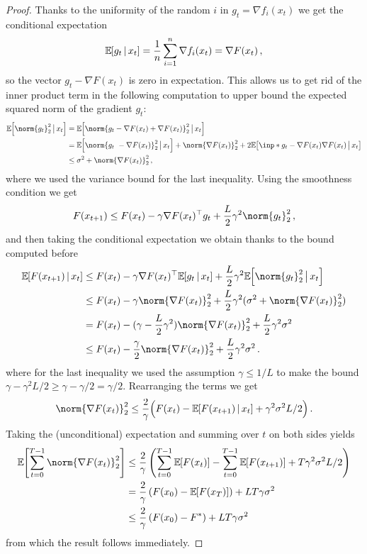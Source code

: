 \documentclass{article}
\begin{document}
\begin{proof}
  Thanks to the uniformity of the random $i$ in $g_t = \nabla f_i (x_t)$ we get the conditional expectation
  \[
    \mathbb{\operatorname{\mathbb{E}}}_{\!\!}\left[g_t \,|\, x_t\right] = \frac{1}{n} \sum_{i=1}^n \nabla f_i(x_t) = \nabla F(x_t)
    \, ,
  \]
  so the vector $g_t - \nabla F(x_t)$ is zero in expectation. This allows us to get rid of the inner product term in the following computation to upper bound the expected squared norm of the gradient $g_t$:
  \begin{align*}
    \expec{\norm{g_t}_2^2  \,\big|\, x_t}
     & =
    \expec{\norm{g_t - \nabla F(x_t) + \nabla F(x_t)}_2^2  \,\big|\, x_t}
    \\
     & =
    \expec{\norm{g_t\ - \nabla F(x_t)}_2^2  \,\big|\, x_t} + \norm{\nabla F(x_t)}_2^2 + 2 \expec{ \inp*{g_t - \nabla F(x_t)}{\nabla F(x_t)} \,\big|\, x_t}
    \\
     & \leq
    \sigma^2 + \norm{\nabla F(x_t)}_2^2
    \, ,
  \end{align*}
  where we used the variance bound for the last inequality.
  Using the smoothness condition we get
  \[
    F(x_{t+1}) \leq F(x_t) - \gamma \nabla F(x_t)^\top g_t + \frac{L}{2} \gamma^2 \norm{g_t}_2^2
    \, ,
  \]
  and then taking the conditional expectation we obtain thanks to the bound computed before
  \begin{align*}
    \expec{F(x_{t+1})  \,|\, x_t}
     & \leq
    F(x_t) - \gamma \nabla F(x_t)^\top \expec{g_t \,|\, x_t} + \frac{L}{2} \gamma^2 \expec{\norm{g_t}_2^2 \,\big|\, x_t}
    \\
     & \leq
    F(x_t) - \gamma \norm{\nabla F(x_t)}_2^2 + \frac{L}{2} \gamma^2  (\sigma^2 + \norm{\nabla F(x_t)}_2^2)
    \\
     & =
    F(x_t) - (\gamma - \frac{L}{2} \gamma^2) \norm{\nabla F(x_t)}_2^2 + \frac{L}{2} \gamma^2  \sigma^2
    \\
     & \leq
    F(x_t) - \frac{\gamma}{2} \norm{\nabla F(x_t)}_2^2 + \frac{L}{2} \gamma^2  \sigma^2
    \, .
  \end{align*}
  where for the last inequality we used the assumption $\gamma \leq 1/L$ to make the bound $\gamma - \gamma^2 L/2 \geq \gamma - \gamma/2 = \gamma/2$.
  Rearranging the terms we get
  \[
    \norm{\nabla F(x_t)}_2^2
    \leq
    \frac{2}{\gamma} \Bigl(F(x_t) - \expec{F(x_{t+1}) \,|\, x_t}  + \gamma^2 \sigma^2 L/2 \Bigr)
    \, .
  \]
  Taking the (unconditional) expectation and summing over $t$ on both sides yields
  \begin{align*}
    \expec{ \sum_{t=0}^{T-1} \norm{\nabla F(x_t)}_2^2 }
     & \leq
    \frac{2}{\gamma} \left(\sum_{t=0}^{T-1} \expec{F(x_t)} - \sum_{t=0}^{T-1} \expec{F(x_{t+1})} + T \gamma^2 \sigma^2 L/2 \right)
    \\
     & =
    \frac{2}{\gamma}  \left(F(x_0) - \expec{F(x_{T})}\right) + L T \gamma \sigma^2
    \\
     & \leq
    \frac{2}{\gamma}  \left(F(x_0) - F^\ast\right) + L T \gamma \sigma^2
  \end{align*}
  from which the result follows immediately.
\end{proof}
\end{document}
